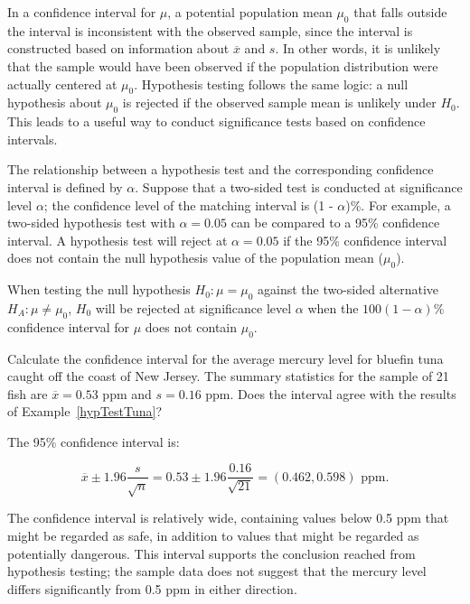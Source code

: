 \begin{spacing}{1.5}
In a confidence interval for $\mu$, a potential population mean $\mu_0$ that falls outside the interval is inconsistent with the observed sample, since the interval is constructed based on information about $\overline{x}$ and $s$. In other words, it is unlikely that the sample would have been observed if the population distribution were actually centered at $\mu_0$. Hypothesis testing follows the same logic: a null hypothesis about $\mu_0$ is rejected if the observed sample mean is unlikely under $H_0$. This leads to a useful way to conduct significance tests based on confidence intervals.

The relationship between a hypothesis test and the corresponding confidence interval is defined by $\alpha$. Suppose that a two-sided test is conducted at significance level $\alpha$; the confidence level of the matching interval is (1 - $\alpha$)\%. For example, a two-sided hypothesis test with $\alpha = 0.05$ can be compared to a 95\% confidence interval. A hypothesis test will reject at $\alpha = 0.05$ if the 95\% confidence interval does not contain the null hypothesis value of the population mean ($\mu_0$).

\begin{termBox}{
{When testing the null hypothesis $H_0:\mu = \mu_0$ against the two-sided alternative $H_A: \mu \neq \mu_0$, $H_0$ will be rejected at significance level $\alpha$ when the $100(1-\alpha)\%$ confidence interval for $\mu$ does not contain $\mu_0$. }}
\end{termBox}

\begin{example}
{Calculate the confidence interval for the average mercury level for bluefin tuna caught off the coast of New Jersey. The summary statistics for the sample of 21 fish are $\overline{x} = 0.53$ ppm and $s = 0.16$ ppm. Does the interval agree with the results of Example~\ref{hypTestTuna}?}

The 95\% confidence interval is: 

\[\overline{x} \pm 1.96 \dfrac{s}{\sqrt{n}}= 0.53 \pm 1.96 \frac{0.16}{\sqrt{21}} = (0.462, 0.598) \text{ ppm}.\]

The confidence interval is relatively wide, containing values below 0.5 ppm that might be regarded as safe, in addition to values that might be regarded as potentially dangerous. This interval supports the conclusion reached from hypothesis testing; the sample data does not suggest that the mercury level differs significantly from 0.5 ppm in either direction. 


\end{example}
\end{spacing}
